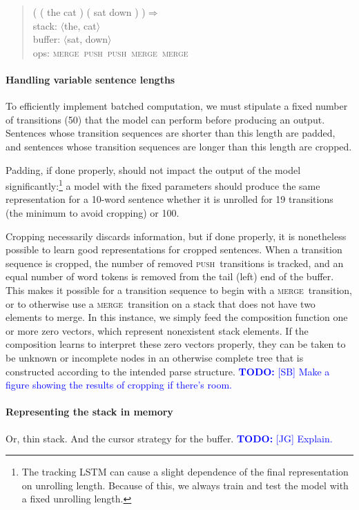\documentclass[11pt,letterpaper]{article}
\newcommand\todo[1]{\textcolor{blue}{\textbf{TODO:} #1}}
\newcommand{\shift}{\textsc{push}}
\newcommand{\reduce}{\textsc{merge}}
\begin{document}
\begin{quote}\small
( ( the cat ) ( sat down ) )$\Rightarrow$ \\
stack: $\langle$the, cat$\rangle$\\
buffer: $\langle$sat, down$\rangle$\\
ops: \reduce~\shift~\shift~\reduce~\reduce
\end{quote}

\paragraph{Handling variable sentence lengths}

To efficiently implement batched computation, we must stipulate a fixed number of transitions (50) that the model can perform before producing an output. Sentences whose transition sequences are shorter than this length are padded, and sentences whose transition sequences are longer than this length are cropped. 

Padding, if done properly, should not impact the output of the model significantly:\footnote{The tracking LSTM can cause a slight dependence of the final representation on unrolling length. Because of this, we always train and test the model with a fixed unrolling length.} a model with the fixed parameters should produce the same representation for a 10-word sentence whether it is unrolled for 19 transitions (the minimum to avoid cropping) or 100.

Cropping necessarily discards information, but if done properly, it is nonetheless possible to learn good representations for cropped sentences. When a transition sequence is cropped, the number of removed \shift~transitions is tracked, and an equal number of word tokens is removed from the tail (left) end of the buffer. This makes it possible for a transition sequence to begin with a \reduce~transition, or to otherwise use a \reduce~transition on a stack that does not have two elements to merge. In this instance, we simply feed the composition function one or more zero vectors, which represent nonexistent stack elements. If the composition learns to interpret these zero vectors properly, they can be taken to be unknown or incomplete nodes in an otherwise complete tree that is constructed according to the intended parse structure. \todo{[SB] Make a figure showing the results of cropping if there's room.}

\paragraph{Representing the stack in memory} Or, thin stack. And the cursor strategy for the buffer. 
\todo{[JG] Explain.}
\end{document}
